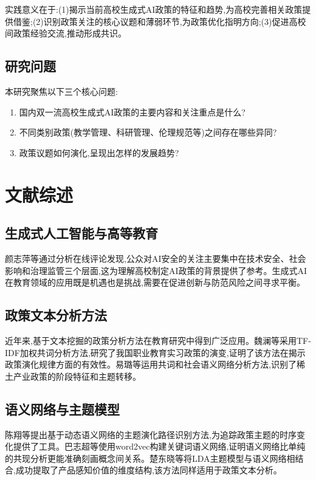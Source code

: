 \documentclass[cn,11pt,chinese]{article}
\begin{document}
实践意义在于:(1)揭示当前高校生成式AI政策的特征和趋势,为高校完善相关政策提供借鉴;(2)识别政策关注的核心议题和薄弱环节,为政策优化指明方向;(3)促进高校间政策经验交流,推动形成共识。

\subsection{研究问题}

本研究聚焦以下三个核心问题:
\begin{enumerate}
\item 国内双一流高校生成式AI政策的主要内容和关注重点是什么?
\item 不同类别政策(教学管理、科研管理、伦理规范等)之间存在哪些异同?
\item 政策议题如何演化,呈现出怎样的发展趋势?
\end{enumerate}

\section{文献综述}

\subsection{生成式人工智能与高等教育}

颜志萍等\cite{ref1}通过分析在线评论发现,公众对AI安全的关注主要集中在技术安全、社会影响和治理监管三个层面,这为理解高校制定AI政策的背景提供了参考。生成式AI在教育领域的应用既是机遇也是挑战,需要在促进创新与防范风险之间寻求平衡。

\subsection{政策文本分析方法}

近年来,基于文本挖掘的政策分析方法在教育研究中得到广泛应用。魏澜等\cite{ref2}采用TF-IDF加权共词分析方法,研究了我国职业教育实习政策的演变,证明了该方法在揭示政策演化规律方面的有效性。易璐等\cite{ref3}运用共词和社会语义网络分析方法,识别了稀土产业政策的阶段特征和主题转移。

\subsection{语义网络与主题模型}

陈翔等\cite{ref5}提出基于动态语义网络的主题演化路径识别方法,为追踪政策主题的时序变化提供了工具。巴志超等\cite{ref6}使用word2vec构建关键词语义网络,证明语义网络比单纯的共现分析更能准确刻画概念间关系。楚东晓等\cite{ref9}将LDA主题模型与语义网络相结合,成功提取了产品感知价值的维度结构,该方法同样适用于政策文本分析。
\end{document}
